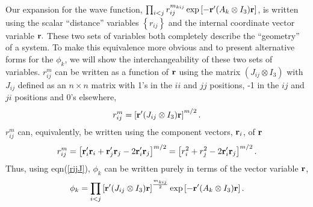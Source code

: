 Our expansion for the wave function, $\prod_{i<j}r_{ij}^{m_{kij}}\exp
\left[ -{\bf r}^{\prime }(A_k\otimes I_3){\bf r}\right] $, is written
using the scalar ``distance'' variables $\left\{ r_{ij}\right\} $ and the
internal coordinate vector variable ${\bf r.}$ These two sets of
variables both completely describe the ``geometry'' of a system. To make
this equivalence more obvious and to present alternative forms for the $\phi
_k$, we will show the interchangeability of these two sets of variables. $%
r_{ij}^m$ can be written as a function of ${\bf r}$ using the matrix $%
\left( J_{ij}\otimes I_3\right) $ with $J_{ij}$ defined as an $n\times n$
matrix with 1's in the $ii$ and $jj$ positions, -1 in the $ij$ and $ji$
positions and 0's elsewhere\cite{Poshusta83,Kinghorn95a}, 
\begin{equation}
r_{ij}^m=\left[ {\bf r}^{\prime }(J_{ij}\otimes I_3){\bf r}\right]
^{m/2}.  \label{rijJ}
\end{equation}
$r_{ij}^m$ can, equivalently, be written using the component vectors, $%
{\bf r}_i$, of ${\bf r}$ 
\begin{equation}
r_{ij}^m = \left[ {\bf r}_i^{\prime }{\bf r}_i+{\bf r}_j^{\prime }%
{\bf r}_j-2{\bf r}_i^{\prime }{\bf r}_j\right] ^{m/2} 
= \left[ r_i^2+r_j^2-2{\bf r}_i^{\prime }{\bf r}_j\right] ^{m/2}.
\end{equation}
Thus, using eqn(\ref{rijJ}), $\phi _k$ can be written purely in terms of the
vector variable ${\bf r}$, 
\begin{equation}
\phi _k=\prod_{i<j}\left[ {\bf r}^{\prime }(J_{ij}\otimes I_3){\bf r}%
\right] ^{\frac{m_{kij}}2}\exp \left[ -{\bf r}^{\prime }(A_k\otimes I_3)%
{\bf r}\right] .  \label{phir}
\end{equation}

